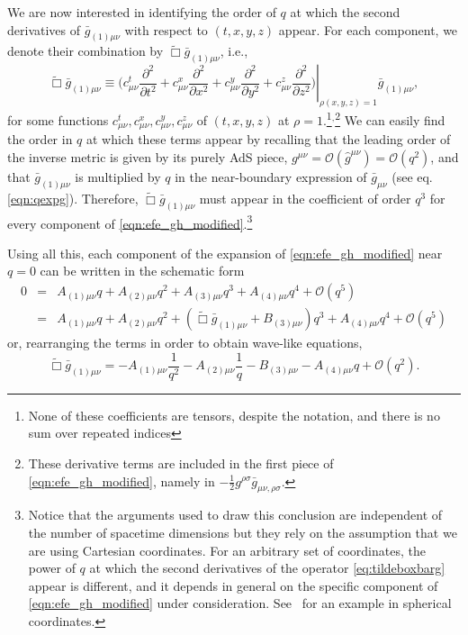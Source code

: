 \documentclass[a4paper,11pt]{article}
\numberwithin{equation}{section}
\begin{document}
We are now interested in identifying the order of $q$ at which the second derivatives of $ \bar{g}_{(1) \mu \nu}$ with respect to $(t,x,y,z)$ 
appear.
For each component, we denote their combination by $\tilde{\Box}\bar{g}_{(1)\mu\nu}$, i.e., 
\begin{equation}
\label{eq:tildeboxbarg}
\tilde{\Box}\bar{g}_{(1)\mu\nu}\equiv\left.\biggl(c^t_{\mu\nu}\frac{\partial^2}{\partial t^2}+c^x_{\mu\nu}\frac{\partial^2}{\partial x^2}+c^y_{\mu\nu}\frac{\partial^2}{\partial y^2}+c^z_{\mu\nu}\frac{\partial^2}{\partial z^2}\biggr)\right |_{\rho(x,y,z)=1}\bar{g}_{(1)\mu\nu},
\end{equation}
for some functions $c^t_{\mu\nu},c^x_{\mu\nu},c^y_{\mu\nu},c^z_{\mu\nu}$ of $(t,x,y,z)$ at $\rho=1$.\footnote{None of these coefficients are tensors, despite the notation, and there is no sum over repeated indices}$^{,}$\footnote{These derivative terms are included in the first piece of \eqref{eqn:efe_gh_modified},  namely in $-\frac{1}{2}g^{\rho \sigma} \bar{g}_{\mu \nu, \rho \sigma}$.}
We can easily find the order in $q$ at which these terms appear by recalling that the leading order of the inverse metric is given by its purely AdS piece, $g^{\mu\nu}=\mathcal{O}(\hat{g}^{\mu\nu})=\mathcal{O}(q^{2})$, and that $\bar{g}_{(1)\mu\nu}$ is multiplied by $q$ in the near-boundary expression of $\bar{g}_{\mu\nu}$ (see  eq. \eqref{eqn:qexpg}). Therefore, $\tilde{\Box}\bar{g}_{(1)\mu\nu}$ must appear in the coefficient of order $q^{3}$ for every component of \eqref{eqn:efe_gh_modified}.\footnote{Notice that the arguments used to draw this conclusion are independent of the number of spacetime dimensions but they rely on the assumption that we are using Cartesian coordinates. For an arbitrary set of coordinates, the power of $q$ at which the second derivatives of the operator \eqref{eq:tildeboxbarg} appear is different, and it depends in general on the specific component of \eqref{eqn:efe_gh_modified} under consideration. See~\cite{Bantilan:2012vu} for an example in spherical coordinates.}

Using all this, each component of the expansion of 
\eqref{eqn:efe_gh_modified} near $q=0$ can be written in the schematic form
\begin{eqnarray}\label{eq:efefullexp}
0 
&=& A_{(1)\mu\nu}q+A_{(2)\mu\nu}q^2+A_{(3)\mu\nu}q^3+A_{(4)\mu\nu}q^4+\mathcal{O}(q^5) \nonumber \\
&=& A_{(1)\mu\nu}q+A_{(2)\mu\nu}q^2+(\tilde{\Box}\bar{g}_{(1)\mu\nu}+B_{(3)\mu\nu})q^3+A_{(4)\mu\nu}q^4+\mathcal{O}(q^5)
\end{eqnarray}
or, rearranging the terms in order to obtain wave-like equations,
\begin{equation}
\label{eq:waveEFE}
\tilde{\Box}\bar{g}_{(1)\mu\nu}=-A_{(1)\mu\nu}\frac{1}{q^2}-A_{(2)\mu\nu}\frac{1}{q}-B_{(3)\mu\nu}-A_{(4)\mu\nu}q+\mathcal{O}(q^2).
\end{equation}
\end{document}
